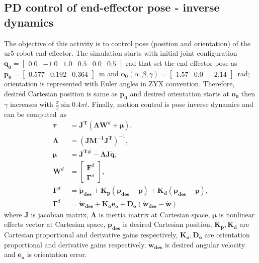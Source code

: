 \graphicspath{{images/act_3.6/}}
\setcounter{subsection}{5}
\subsection{PD control of end-effector pose - inverse dynamics}
The objective of this activity is to control pose (position and orientation) of the ur5 robot end-effector. The simulation starts with initial joint configuration $\mathbf{q_0}=\begin{bmatrix} 0.0 & -1.0 & 1.0 & 0.5 & 0.0 & 0.5 \end{bmatrix}$ rad that set the end-effector pose as $\mathbf{p_0}=\begin{bmatrix}  0.577 &   0.192 &   0.364 \end{bmatrix}$~m and $\mathbf{o_0}(\alpha, \beta, \gamma)= \begin{bmatrix} 1.57 & 0.0 & -2.14 \end{bmatrix}$~rad; orientation is represented with Euler angles in ZYX convention. Therefore, desired Cartesian position is same as $\mathbf{p_0}$ and desired orientation starts at $\mathbf{o_0}$ then $\gamma$ increases with $\frac{\pi}{2}\sin{0.4\pi t}$. Finally, motion control is pose inverse dynamics and can be computed~as 
\begin{align}
	\boldsymbol{\tau} &= \mathbf{J^T} (\boldsymbol{\Lambda}\mathbf{W}^{d} + \boldsymbol{\mu}), \label{eq:pose_idyn}
	\\
	\boldsymbol{\Lambda} &= (\mathbf{J M^{-1} J^{T}})^{-1}, 
	\nonumber \\
	\boldsymbol{\mu} &= \mathbf{J^{T\#}} - \boldsymbol{\Lambda}\mathbf{\dot{J}\dot{q}}, 
	\nonumber \\	
	\mathbf{W}^{d} &=
	\begin{bmatrix}
	\mathbf{F}^{d} \\ \boldsymbol{\Gamma}^{d}
	\end{bmatrix}, 
	\nonumber \\
	\mathbf{F}^{d} &= \mathbf{\ddot{p}_{des}} + \mathbf{K_p (p_{des}-p)} + \mathbf{K_d (\dot{p}_{des}-\dot{p})}, 
	\nonumber \\
	\boldsymbol{\Gamma}^{d} &= \mathbf{\dot{w}_{des}} + \mathbf{K_o e_o} + \mathbf{D_o (\dot{w}_{des}-\dot{w})} \nonumber
\end{align}
\noindent where $\mathbf{J}$ is jacobian matrix, $\boldsymbol{\Lambda}$ is inertia matrix at Cartesian space, $\boldsymbol{\mu}$ is nonlinear effects vector at Cartesian space, $\mathbf{p_{des}}$ is desired Cartesian position, $\mathbf{K_p, K_d}$ are Cartesian proportional and derivative gains respectively, $\mathbf{K_o, D_o}$ are orientation proportional and derivative gains respectively, $\mathbf{w_{des}}$ is desired angular velocity and $\mathbf{e_o}$ is orientation error. \vspace{.5cm}